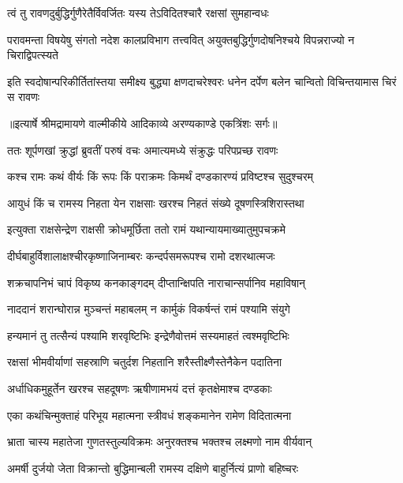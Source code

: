 \twolineshloka
{त्वं तु रावणदुर्बुद्धिर्गुणैरेतैर्विवर्जितः}
{यस्य तेऽविदितश्चारै रक्षसां सुमहान्वधः} %

\fourlineindentedshloka
{परावमन्ता विषयेषु संगतो}
{ नदेश कालप्रविभाग तत्त्ववित्}
{अयुक्तबुद्धिर्गुणदोषनिश्चये}
{ विपन्नराज्यो न चिराद्विपत्स्यते} %

\fourlineindentedshloka
{इति स्वदोषान्परिकीर्तितांस्तया}
{ समीक्ष्य बुद्ध्या क्षणदाचरेश्वरः}
{धनेन दर्पेण बलेन चान्वितो}
{ विचिन्तयामास चिरं स रावणः} %


{॥इत्यार्षे श्रीमद्रामायणे वाल्मीकीये आदिकाव्ये अरण्यकाण्डे एकत्रिंशः सर्गः॥}


\twolineshloka
{ततः शूर्पणखां क्रुद्धां ब्रुवतीं परुषं वचः}
{अमात्यमध्ये संक्रुद्धः परिपप्रच्छ रावणः} %

\twolineshloka
{कश्च रामः कथं वीर्यः किं रूपः किं पराक्रमः}
{किमर्थं दण्डकारण्यं प्रविष्टश्च सुदुश्चरम्} %

\twolineshloka
{आयुधं किं च रामस्य निहता येन राक्षसाः}
{खरश्च निहतं संख्ये दूषणस्त्रिशिरास्तथा} %

\twolineshloka
{इत्युक्ता राक्षसेन्द्रेण राक्षसी क्रोधमूर्छिता}
{ततो रामं यथान्यायमाख्यातुमुपचक्रमे} %

\twolineshloka
{दीर्घबाहुर्विशालाक्षश्चीरकृष्णाजिनाम्बरः}
{कन्दर्पसमरूपश्च रामो दशरथात्मजः} %

\twolineshloka
{शक्रचापनिभं चापं विकृष्य कनकाङ्गदम्}
{दीप्तान्क्षिपति नाराचान्सर्पानिव महाविषान्} %

\twolineshloka
{नाददानं शरान्घोरान्न मुञ्चन्तं महाबलम्}
{न कार्मुकं विकर्षन्तं रामं पश्यामि संयुगे} %

\twolineshloka
{हन्यमानं तु तत्सैन्यं पश्यामि शरवृष्टिभिः}
{इन्द्रेणैवोत्तमं सस्यमाहतं त्वश्मवृष्टिभिः} %

\twolineshloka
{रक्षसां भीमवीर्याणां सहस्राणि चतुर्दश}
{निहतानि शरैस्तीक्ष्णैस्तेनैकेन पदातिना} %

\twolineshloka
{अर्धाधिकमुहूर्तेन खरश्च सहदूषणः}
{ऋषीणामभयं दत्तं कृतक्षेमाश्च दण्डकाः} %

\twolineshloka
{एका कथंचिन्मुक्ताहं परिभूय महात्मना}
{स्त्रीवधं शङ्कमानेन रामेण विदितात्मना} %

\twolineshloka
{भ्राता चास्य महातेजा गुणतस्तुल्यविक्रमः}
{अनुरक्तश्च भक्तश्च लक्ष्मणो नाम वीर्यवान्} %

\twolineshloka
{अमर्षी दुर्जयो जेता विक्रान्तो बुद्धिमान्बली}
{रामस्य दक्षिणे बाहुर्नित्यं प्राणो बहिष्चरः} %

